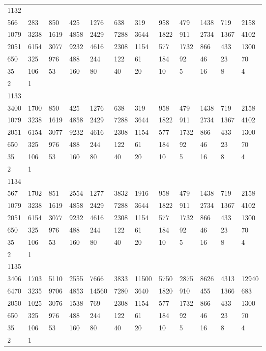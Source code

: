 \begin{longtable}{llllllllllll}
1132&&&&&&&&&&&\\
566& 283& 850& 425& 1276& 638& 319& 958& 479& 1438& 719& 2158\\
1079& 3238& 1619& 4858& 2429& 7288& 3644& 1822& 911& 2734& 1367& 4102\\
2051& 6154& 3077& 9232& 4616& 2308& 1154& 577& 1732& 866& 433& 1300\\
650& 325& 976& 488& 244& 122& 61& 184& 92& 46& 23& 70\\
35& 106& 53& 160& 80& 40& 20& 10& 5& 16& 8& 4\\
2& 1& \\

1133&&&&&&&&&&&\\
3400& 1700& 850& 425& 1276& 638& 319& 958& 479& 1438& 719& 2158\\
1079& 3238& 1619& 4858& 2429& 7288& 3644& 1822& 911& 2734& 1367& 4102\\
2051& 6154& 3077& 9232& 4616& 2308& 1154& 577& 1732& 866& 433& 1300\\
650& 325& 976& 488& 244& 122& 61& 184& 92& 46& 23& 70\\
35& 106& 53& 160& 80& 40& 20& 10& 5& 16& 8& 4\\
2& 1& \\

1134&&&&&&&&&&&\\
567& 1702& 851& 2554& 1277& 3832& 1916& 958& 479& 1438& 719& 2158\\
1079& 3238& 1619& 4858& 2429& 7288& 3644& 1822& 911& 2734& 1367& 4102\\
2051& 6154& 3077& 9232& 4616& 2308& 1154& 577& 1732& 866& 433& 1300\\
650& 325& 976& 488& 244& 122& 61& 184& 92& 46& 23& 70\\
35& 106& 53& 160& 80& 40& 20& 10& 5& 16& 8& 4\\
2& 1& \\

1135&&&&&&&&&&&\\
3406& 1703& 5110& 2555& 7666& 3833& 11500& 5750& 2875& 8626& 4313& 12940\\
6470& 3235& 9706& 4853& 14560& 7280& 3640& 1820& 910& 455& 1366& 683\\
2050& 1025& 3076& 1538& 769& 2308& 1154& 577& 1732& 866& 433& 1300\\
650& 325& 976& 488& 244& 122& 61& 184& 92& 46& 23& 70\\
35& 106& 53& 160& 80& 40& 20& 10& 5& 16& 8& 4\\
2& 1& \\


\end{longtable}
